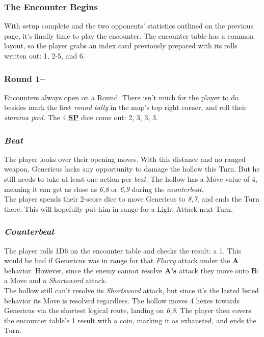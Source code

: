 \documentclass[12pt]{article}
\newcommand{\refto}[1]{\hyperlink{#1}{\textbf{#1}}}
\begin{document}
\begin{multicols*}{2}
\subsubsection*{The Encounter Begins}
With setup complete and the two opponents’ statistics outlined on the previous page, it’s finally time to play the encounter. The encounter table has a common layout, so the player grabs an index card previously prepared with its rolls written out: 1, 2-5, and 6.
\subsubsection*{Round 1--}
Encounters always open on a Round. There isn’t much for the player to do besides mark the first \emph{round tally} in the map’s top right corner, and roll their \emph{stamina pool.} The 4 \refto{SP} dice come out: 2, 3, 3, 3.
\subsubsection*{\emph{Beat}}
The player looks over their opening moves. With this distance and no ranged weapon, Genericus lacks any opportunity to damage the hollow this Turn. But he still needs to take at least one action per \emph{beat.} The hollow has a Move value of 4, meaning it can get as close as \emph{6,8} or \emph{6,9} during the \emph{counterbeat.}\\
The player spends their 2-score dice to move Genericus to \emph{8,7}, and ends the Turn there. This will hopefully put him in range for a Light Attack next Turn.
\subsubsection*{\emph{Counterbeat}}
The player rolls 1D6 on the encounter table and checks the result: a 1. This would be bad if Genericus was in range for that \emph{Flurry} attack under the \textbf{A} behavior. However, since the enemy cannot resolve \textbf{A’s} attack they move onto \textbf{B}: a Move and a \emph{Shortsword} attack.\\
The hollow still can’t resolve its \emph{Shortsword} attack, but since it’s the lasted listed behavior its Move is resolved regardless. The hollow moves 4 hexes towards Genericus via the shortest logical route, landing on \emph{6,8}. The player then covers the encounter table’s 1 result with a coin, marking it as exhausted, and ends the Turn.

\end{multicols*}
\end{document}
